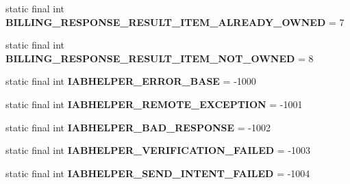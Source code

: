 \begin{DoxyCompactItemize}
\item 
\mbox{\label{classorg_1_1cocos2dx_1_1plugin_1_1util_1_1IabHelper_ae790722324e31f391bc261e0a3b15383}} 
static final int {\bfseries B\+I\+L\+L\+I\+N\+G\+\_\+\+R\+E\+S\+P\+O\+N\+S\+E\+\_\+\+R\+E\+S\+U\+L\+T\+\_\+\+I\+T\+E\+M\+\_\+\+A\+L\+R\+E\+A\+D\+Y\+\_\+\+O\+W\+N\+ED} = 7
\item 
\mbox{\label{classorg_1_1cocos2dx_1_1plugin_1_1util_1_1IabHelper_a1147508cb3becc0e174744ab5c9156cb}} 
static final int {\bfseries B\+I\+L\+L\+I\+N\+G\+\_\+\+R\+E\+S\+P\+O\+N\+S\+E\+\_\+\+R\+E\+S\+U\+L\+T\+\_\+\+I\+T\+E\+M\+\_\+\+N\+O\+T\+\_\+\+O\+W\+N\+ED} = 8
\item 
\mbox{\label{classorg_1_1cocos2dx_1_1plugin_1_1util_1_1IabHelper_a1c7fb8f940702fb4ddf6ab515f2c0cb0}} 
static final int {\bfseries I\+A\+B\+H\+E\+L\+P\+E\+R\+\_\+\+E\+R\+R\+O\+R\+\_\+\+B\+A\+SE} = -\/1000
\item 
\mbox{\label{classorg_1_1cocos2dx_1_1plugin_1_1util_1_1IabHelper_a3bb496ef409939fe39ca66d079bc7446}} 
static final int {\bfseries I\+A\+B\+H\+E\+L\+P\+E\+R\+\_\+\+R\+E\+M\+O\+T\+E\+\_\+\+E\+X\+C\+E\+P\+T\+I\+ON} = -\/1001
\item 
\mbox{\label{classorg_1_1cocos2dx_1_1plugin_1_1util_1_1IabHelper_a44a7cf7e8df21c81df454ad81f086442}} 
static final int {\bfseries I\+A\+B\+H\+E\+L\+P\+E\+R\+\_\+\+B\+A\+D\+\_\+\+R\+E\+S\+P\+O\+N\+SE} = -\/1002
\item 
\mbox{\label{classorg_1_1cocos2dx_1_1plugin_1_1util_1_1IabHelper_af98a41b6eedd9f0a53dc86aa4a202671}} 
static final int {\bfseries I\+A\+B\+H\+E\+L\+P\+E\+R\+\_\+\+V\+E\+R\+I\+F\+I\+C\+A\+T\+I\+O\+N\+\_\+\+F\+A\+I\+L\+ED} = -\/1003
\item 
\mbox{\label{classorg_1_1cocos2dx_1_1plugin_1_1util_1_1IabHelper_aefa46fce113c7f1dd54832c0530aa3b8}} 
static final int {\bfseries I\+A\+B\+H\+E\+L\+P\+E\+R\+\_\+\+S\+E\+N\+D\+\_\+\+I\+N\+T\+E\+N\+T\+\_\+\+F\+A\+I\+L\+ED} = -\/1004

\end{DoxyCompactItemize}
